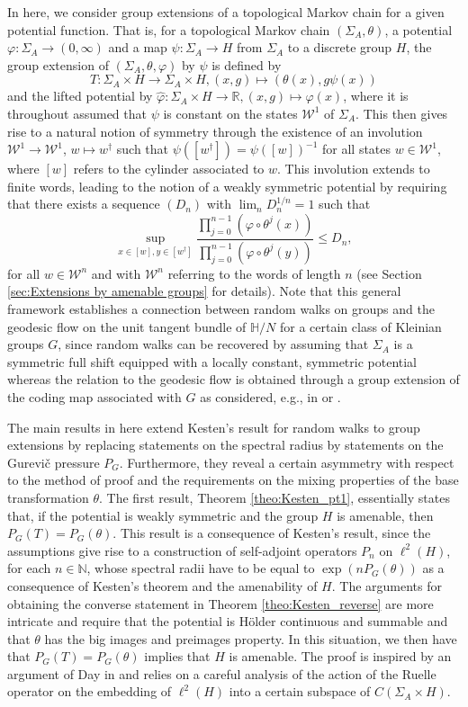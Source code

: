 \documentclass[10pt]{article}
\theoremstyle{mystyle}
\newcommand{\R}{\mathbb{R}}
\newcommand{\N}{\mathbb{N}}
\renewcommand{\H}{\mathbb{H}}
\newcommand{\cW}{\mathcal{W}}
\newcommand{\te}{{\theta}}
\newcommand{\Sig}{{\Sigma}}
\newcommand{\1}{\mathbf{1}}
\begin{document}
In here, we consider group extensions of a topological Markov chain for a given potential function. That is, for a topological Markov chain $(\Sig_A,\theta)$, a potential $\varphi:\Sig_A \to (0,\infty)$ and a map $\psi: \Sig_A \to H$ from $\Sig_A$ to a discrete group $H$, the group extension of $(\Sig_A,\theta,\varphi)$ by $\psi$ is defined by 
\[ T: \Sig_A \times H \to \Sig_A \times H, (x,g) \mapsto (\theta(x),g \psi(x))\]
and the lifted potential by $\hat\varphi: \Sig_A \times H \to \R, (x,g) \mapsto \varphi(x)$, where it is throughout assumed that $\psi$ is constant on the states $\cW^1$ of $\Sig_A$. This then gives rise to a natural notion of symmetry through the existence of an involution $\cW^1 \to \cW^1$, $w \mapsto w^\dagger$ such that  $\psi({[w^\dagger]}) = \psi({[w]})^{-1}$ for all states $w \in \cW^1$, where $[w]$ refers to the cylinder associated to $w$.  This involution extends to finite words, leading to the notion of a weakly symmetric potential by requiring that there exists a sequence $(D_n)$ with $\lim_n D_n^{1/n} =1$ such that 
\[  \sup_{x \in [w], y \in [w^\dagger]} \frac{\prod_{j=0}^{n-1}(\varphi\circ\te^j(x))}{\prod_{j=0}^{n-1}(\varphi\circ\te^j(y))} \leq D_n  ,\]
for all $w \in \cW^n$ and with $\cW^n$ referring to the words of length $n$ (see Section \ref{sec:Extensions by amenable groups} for details). Note that this general framework establishes a connection between random walks on groups and the geodesic flow on the unit tangent bundle of $\H/N$ for a certain class of Kleinian groups $G$, since random walks can be recovered by assuming that $\Sig_A$ is a symmetric full shift equipped with a locally constant, symmetric potential whereas the relation to the geodesic flow is obtained through a group extension of the coding map associated with $G$ as considered, e.g.,  in \cite{AaronsonDenker:1999} or \cite{LedrappierSarig:2008}.  

The main results in here extend Kesten's result for random walks to group extensions by replacing statements on the spectral radius by statements on the Gurevi\v{c} pressure $P_G$. Furthermore, they reveal a certain asymmetry with respect to the method of proof and the requirements on the mixing properties of the base transformation $\te$.
The first result, Theorem \ref{theo:Kesten_pt1}, essentially states that, if the potential is weakly symmetric and the group $H$ is amenable, then $P_G(T)=P_G(\te)$. 
This result is a consequence of Kesten's result, since the assumptions give rise to a construction of self-adjoint operators $P_n$ on $\ell^2(H)$, for each $n \in \N$, whose spectral radii have to be equal to $\exp(n P_G(\te))$ as a consequence of Kesten's theorem and the amenability of $H$. 
The arguments for obtaining the converse statement in Theorem \ref{theo:Kesten_reverse} are more intricate and require that the potential is H\"older continuous and summable and that $\te$ has the big images and preimages property. In this situation, we then have that $P_G(T)=P_G(\te)$ implies that $H$ is amenable. The proof is inspired by an argument of Day in \cite{Day:1964} and relies on a careful analysis of the action of the Ruelle operator on the embedding of $\ell^2(H)$ into a certain subspace of $C(\Sig_A \times H)$. 
\end{document}
